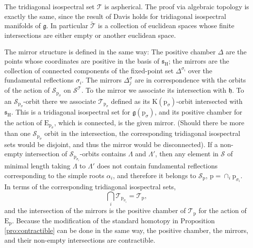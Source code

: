 \documentclass[reqno]{amsart}
\newcommand{\p}{\mathrm{p}}
\renewcommand{\gg}{\mathfrak{g}}
\newcommand{\hh}{\mathfrak{h}}
\renewcommand{\ss}{\mathfrak{s}}
\newcommand{\cS}{\mathcal{S}}
\newcommand{\cT}{\mathcal{T}}
\newcommand{\E}{\mathrm{E}}
\newcommand{\K}{\mathrm{K}}
\renewcommand{\H}{\mathrm{H}}
\begin{document}
The tridiagonal isospectral set $\cT$ is aspherical. The proof via algebraic topology is exactly the same, since the result of Davis \cite{Da2} holds for tridiagonal isospectral manifolds of $\gg$. In particular $\widetilde{\cT}$  is a collection of euclidean spaces whose finite intersections are either empty or another euclidean space.

The mirror structure is defined in the same way:
The positive chamber $\Delta$ are the points whose coordinates are positive in the basis of $\ss_\H$; the mirrors are the collection of connected components of the fixed-point set $\Delta^{\sigma_i}$ over the fundamental reflections $\sigma_i$. The mirrors $\Delta^{\sigma}_j$ are in correspondence with the orbits of the action of $\cS_{\p_{\sigma}}$ on $\cS^\cT$. To the mirror we associate its intersection with $\hh$. To an $\cS_{\p_{\sigma}}$-orbit there we associate $\cT_{\p_{\sigma}}$ defined as its  $\K(\p_{\sigma})$-orbit intersected with $\ss_\H$. This is a tridiagonal isospectral set for $\gg(\p_{\sigma})$, and its positive chamber for the action of $\E_{\p_{\sigma}}$, which is connected, is the given mirror. (Should there be more than one $\cS_{\p_\sigma}$ orbit in the intersection, the corresponding tridiagonal isospectral sets would be disjoint, and thus the mirror would be disconnected).
If a non-empty intersection of $\cS_{\p_{\sigma_i}}$-orbits contains $\Lambda$ and $\Lambda'$, then any  element in $\cS$ of minimal length taking $\Lambda$ to $\Lambda'$ does not contain fundamental reflections corresponding to the simple roots $\alpha_i$, and therefore it belongs to $\cS_\p$, $\p=\cap_i\p_{\sigma_i}$. In terms of the corresponding tridiagonal isospectral sets,
\begin{equation}\label{eq:face-intervals}\bigcap_i\cT_{\p_{\sigma_i}}=\cT_{\p},
 \end{equation}
and the intersection of the mirrors is the positive chamber of $\cT_{\p}$ for the action of $\E_{\p}$. Because the modification of the standard homotopy in Proposition \ref{pro:contractible} can be done in the same way, the positive chamber, the mirrors, and their non-empty intersections are contractible.
\end{document}
